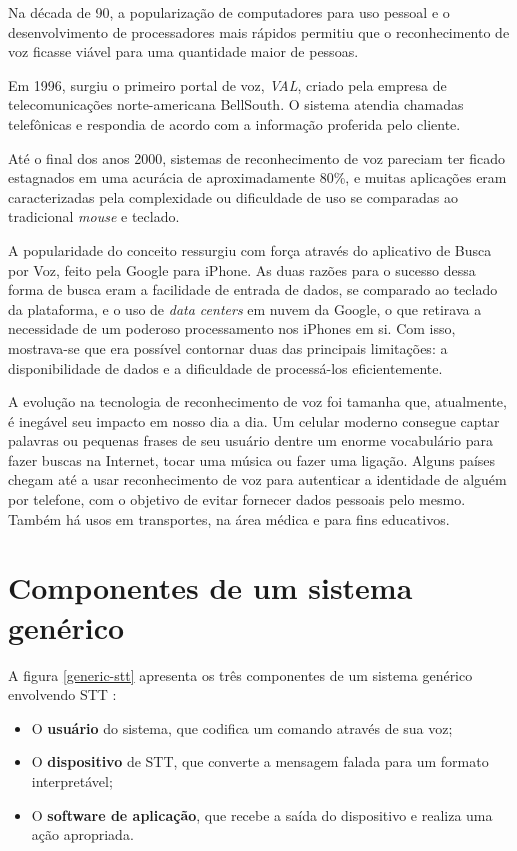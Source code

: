 Na década de 90, a popularização de computadores para uso pessoal e o desenvolvimento de processadores mais rápidos permitiu que o reconhecimento de voz ficasse viável para uma quantidade maior de pessoas.

Em 1996, surgiu o primeiro portal de voz, \emph{VAL}, criado pela empresa de telecomunicações norte-americana BellSouth. O sistema atendia chamadas telefônicas e respondia de acordo com a informação proferida pelo cliente.

Até o final dos anos 2000, sistemas de reconhecimento de voz pareciam ter ficado estagnados em uma acurácia de aproximadamente 80\%, e muitas aplicações eram caracterizadas pela complexidade ou dificuldade de uso se comparadas ao tradicional \textit{mouse} e teclado.

A popularidade do conceito ressurgiu com força através do aplicativo de Busca por Voz, feito pela Google para iPhone. As duas razões para o sucesso dessa forma de busca eram a facilidade de entrada de dados, se comparado ao teclado da plataforma, e o uso de \textit{data centers} em nuvem da Google, o que retirava a necessidade de um poderoso processamento nos iPhones em si. Com isso, mostrava-se que era possível contornar duas das principais limitações: a disponibilidade de dados e a dificuldade de processá-los eficientemente.

A evolução na tecnologia de reconhecimento de voz foi tamanha que, atualmente, é inegável seu impacto em nosso dia a dia. Um celular moderno consegue captar palavras ou pequenas frases de seu usuário dentre um enorme vocabulário para fazer buscas na Internet, tocar uma música ou fazer uma ligação. Alguns países chegam até a usar reconhecimento de voz para autenticar a identidade de alguém por telefone, com o objetivo de evitar fornecer dados pessoais pelo mesmo. Também há usos em transportes, na área médica e para fins educativos.


\section{Componentes de um sistema genérico}
\label{sttComponents}

A figura \ref{generic-stt} apresenta os três componentes de um sistema genérico envolvendo STT \citep{sttComponentsParameters}:

\begin{itemize}
\item O \textbf{usuário} do sistema, que codifica um comando através de sua voz;

\item O \textbf{dispositivo} de STT, que converte a mensagem falada para um formato interpretável;

\item O \textbf{software de aplicação}, que recebe a saída do dispositivo e realiza uma ação apropriada.
\end{itemize}

